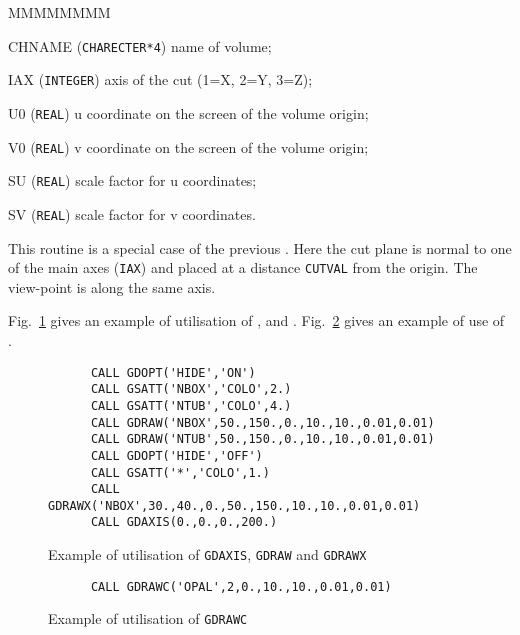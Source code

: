  
\begin{DLtt}{MMMMMMMM}
\item[CHNAME] ({\tt CHARECTER*4}) name of volume;
\item[IAX]  ({\tt INTEGER}) axis of the cut (1=X, 2=Y, 3=Z);
\item[U0]   ({\tt REAL}) u coordinate on the screen of the volume origin;
\item[V0]   ({\tt REAL}) v coordinate on the screen of the volume origin;
\item[SU]   ({\tt REAL}) scale factor for u coordinates;
\item[SV]   ({\tt REAL}) scale factor for v coordinates.
\end{DLtt}

This routine is a special case of the previous .
Here the cut plane is normal to one of the main axes ({\tt IAX})
and placed at a distance {\tt CUTVAL} from the origin.
The view-point is along the same axis.
 
Fig.~\ref{fg:draw120-1} gives an example of utilisation of 
,  and . Fig.~\ref{fg:draw120-2}
gives an example of use of .

\begin{figure}[hbt]
     \centering
\begin{verbatim}
      CALL GDOPT('HIDE','ON')
      CALL GSATT('NBOX','COLO',2.)
      CALL GSATT('NTUB','COLO',4.)
      CALL GDRAW('NBOX',50.,150.,0.,10.,10.,0.01,0.01)
      CALL GDRAW('NTUB',50.,150.,0.,10.,10.,0.01,0.01)
      CALL GDOPT('HIDE','OFF')
      CALL GSATT('*','COLO',1.)
      CALL GDRAWX('NBOX',30.,40.,0.,50.,150.,10.,10.,0.01,0.01)
      CALL GDAXIS(0.,0.,0.,200.)
\end{verbatim}
     \caption{Example of utilisation of 
{\tt GDAXIS}, {\tt GDRAW} and {\tt GDRAWX}}
     \label{fg:draw120-1}
\end{figure}
 
\begin{figure}[hbt]
     \centering
\begin{verbatim}
      CALL GDRAWC('OPAL',2,0.,10.,10.,0.01,0.01)
\end{verbatim}
     \caption{Example of utilisation of {\tt GDRAWC}}
     \label{fg:draw120-2}
\end{figure}
